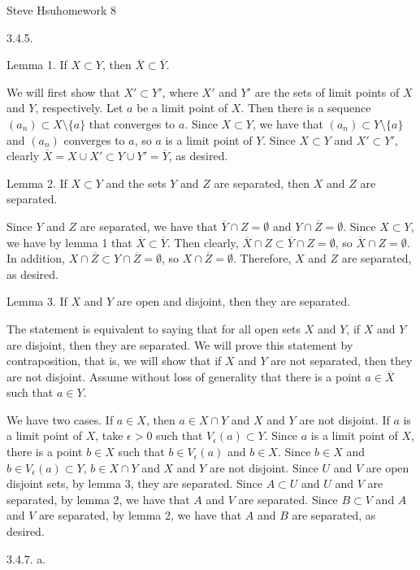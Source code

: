 \def\rational{{\bf Q}}
\def\irrational{{\bf I}}
\def\real{{\bf R}}
\def\abs#1{\vert#1\vert}
\centerline{Steve Hsu\hfill homework 8}
\item{3.4.5.}

\proclaim Lemma 1. If $X \subset Y$, then $\overline X \subset \overline Y$.

We will first show that $X \prime \subset Y \prime$,
where $X \prime$ and $Y \prime$ are the sets of limit points
of $X$ and $Y$, respectively.
Let $a$ be a limit point of $X$.
Then there is a sequence $(a_n) \subset X \setminus \{a\}$
that converges to $a$.
Since $X \subset Y$, we have that $(a_n) \subset Y \setminus \{a\}$
and $(a_n)$ converges to $a$, so $a$ is a limit point of $Y$.
Since $X \subset Y$ and $X \prime \subset Y \prime$,
clearly $\overline X = X \cup X \prime \subset Y \cup Y \prime = \overline Y$,
as desired.

\proclaim Lemma 2. If $X \subset Y$ and the sets $Y$ and $Z$ are separated,
then $X$ and $Z$ are separated.

Since $Y$ and $Z$ are separated, we have that $\overline Y \cap Z = \emptyset$
and $Y \cap \overline Z = \emptyset$.
Since $X \subset Y$, we have by lemma 1 that
$\overline X \subset \overline Y$.
Then clearly, $\overline X \cap Z \subset \overline Y \cap Z = \emptyset$,
so $\overline X \cap Z = \emptyset$.
In addition, $X \cap \overline Z \subset Y \cap \overline Z = \emptyset$,
so $X \cap \overline Z = \emptyset$.
Therefore, $X$ and $Z$ are separated, as desired.

\proclaim Lemma 3. If $X$ and $Y$ are open and disjoint,
then they are separated.

The statement is equivalent to saying that for all open sets $X$ and $Y$,
if $X$ and $Y$ are disjoint, then they are separated.
We will prove this statement by contraposition, that is, we will show that
if $X$ and $Y$ are not separated, then they are not disjoint.
Assume without loss of generality that there is a point $a \in \overline X$
such that $a \in Y$.

We have two cases.
If $a \in X$, then $a \in X \cap Y$ and $X$ and $Y$ are not disjoint.
If $a$ is a limit point of $X$, take $\epsilon > 0$ such that
$V _\epsilon (a) \subset Y$.
Since $a$ is a limit point of $X$, there is a point $b \in X$
such that $b \in V _\epsilon (a)$ and $b \in X$.
Since $b \in X$ and $b \in V _\epsilon (a) \subset Y$,
$b \in X \cap Y$ and $X$ and $Y$ are not disjoint.
\smallskip
Since $U$ and $V$ are open disjoint sets, by lemma 3, they are separated.
Since $A \subset U$ and $U$ and $V$ are separated, by lemma 2,
we have that $A$ and $V$ are separated.
Since $B \subset V$ and $A$ and $V$ are separated, by lemma 2,
we have that $A$ and $B$ are separated, as desired.
\bigskip
\item{3.4.7.} a.

